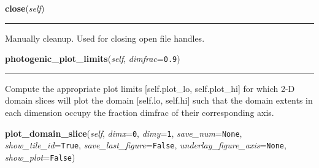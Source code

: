     \label{Tiling:Domain:close}

    \vspace{0.5ex}

\hspace{.8\funcindent}\begin{boxedminipage}{\funcwidth}

    \raggedright \textbf{close}(\textit{self})

    \vspace{-1.5ex}

    \rule{\textwidth}{0.5\fboxrule}
\setlength{\parskip}{2ex}
    Manually cleanup. Used for closing open file handles.

\setlength{\parskip}{1ex}
    \end{boxedminipage}

    \label{Tiling:Domain:photogenic_plot_limits}

    \vspace{0.5ex}

\hspace{.8\funcindent}\begin{boxedminipage}{\funcwidth}

    \raggedright \textbf{photogenic\_plot\_limits}(\textit{self}, \textit{dimfrac}={\tt 0.9})

    \vspace{-1.5ex}

    \rule{\textwidth}{0.5\fboxrule}
\setlength{\parskip}{2ex}
    Compute the appropriate plot limits [self.plot\_lo, self.plot\_hi] for 
    which 2-D domain slices will plot the domain [self.lo, self.hi] such 
    that the domain extents in each dimension occupy the fraction dimfrac 
    of their corresponding axis.

\setlength{\parskip}{1ex}
    \end{boxedminipage}

    \label{Tiling:Domain:plot_domain_slice}

    \vspace{0.5ex}

\hspace{.8\funcindent}\begin{boxedminipage}{\funcwidth}

    \raggedright \textbf{plot\_domain\_slice}(\textit{self}, \textit{dimx}={\tt 0}, \textit{dimy}={\tt 1}, \textit{save\_num}={\tt None}, \textit{show\_tile\_id}={\tt True}, \textit{save\_last\_figure}={\tt False}, \textit{underlay\_figure\_axis}={\tt None}, \textit{show\_plot}={\tt False})

\setlength{\parskip}{2ex}
\setlength{\parskip}{1ex}
    \end{boxedminipage}

